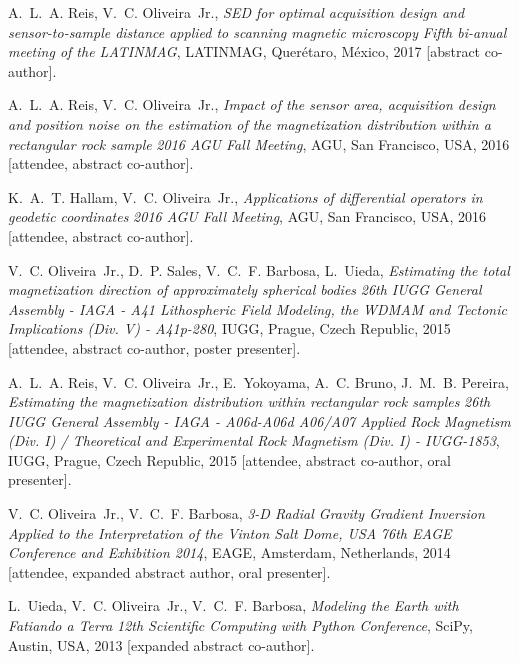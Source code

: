 
\nocite{*}

%
\begin{thebibliography}{10}
	
	A.~L.~A. Reis, V.~C. Oliveira~Jr., \emph{SED for optimal acquisition design and
		sensor-to-sample distance applied to scanning magnetic microscopy} 
	\emph{Fifth bi-anual meeting of the LATINMAG}, LATINMAG, Quer\'{e}taro,
	M\'{e}xico, 2017 [abstract co-author].
	
	A.~L.~A. Reis, V.~C. Oliveira~Jr., \emph{Impact of the sensor area, acquisition
		design and position noise on the estimation of the magnetization distribution
		within a rectangular rock sample} \emph{2016 AGU Fall Meeting}, AGU,
	San Francisco, USA, 2016 [attendee, abstract co-author].
	
	K.~A.~T. Hallam, V.~C. Oliveira~Jr., \emph{Applications of differential
		operators in geodetic coordinates} \emph{2016 AGU Fall Meeting},
	AGU, San Francisco, USA, 2016 [attendee, abstract co-author].
	
	V.~C. Oliveira~Jr., D.~P. Sales, V.~C.~F. Barbosa, L.~Uieda, \emph{Estimating
		the total magnetization direction of approximately spherical bodies} 
	\emph{26th IUGG General Assembly - IAGA - A41 Lithospheric Field Modeling,
		the WDMAM and Tectonic Implications (Div. V) - A41p-280}, IUGG, Prague, Czech
	Republic, 2015 [attendee, abstract co-author, poster presenter].
	
	A.~L.~A. Reis, V.~C. Oliveira~Jr., E.~Yokoyama, A.~C. Bruno, J.~M.~B. Pereira,
	\emph{Estimating the magnetization distribution within rectangular rock
		samples} \emph{26th IUGG General Assembly - IAGA - A06d-A06d A06/A07
		Applied Rock Magnetism (Div. I) / Theoretical and Experimental Rock Magnetism
		(Div. I) - IUGG-1853}, IUGG, Prague, Czech Republic, 2015 [attendee, abstract
	co-author, oral presenter].
	
	V.~C. Oliveira~Jr., V.~C.~F. Barbosa, \emph{3-D Radial Gravity Gradient
		Inversion Applied to the Interpretation of the Vinton Salt Dome, USA}
	\emph{76th EAGE Conference and Exhibition 2014}, EAGE, Amsterdam,
	Netherlands, 2014 [attendee, expanded abstract author, oral presenter].
	
	L.~Uieda, V.~C. Oliveira~Jr., V.~C.~F. Barbosa, \emph{Modeling the Earth with
		Fatiando a Terra} \emph{12th Scientific Computing with Python
		Conference}, SciPy, Austin, USA, 2013 [expanded abstract co-author].
	

\end{thebibliography}
